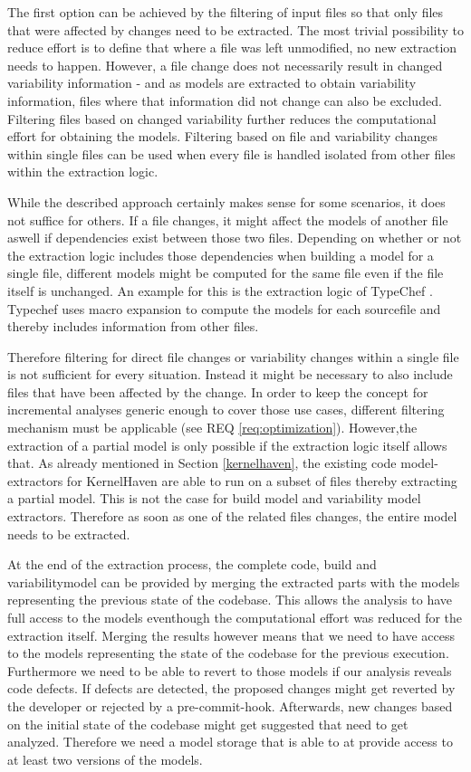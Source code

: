 \documentclass[a4paper]{article}
\begin{document}
The first option can be achieved by the filtering of input files so that only files that were affected by changes need to be extracted. The most trivial possibility to reduce effort is to define that where a file was left unmodified, no new extraction needs to happen. 
However, a file change does not necessarily result in changed variability information - and as models are extracted to obtain variability information, files where that information did not change can also be excluded. Filtering files based on changed variability further reduces the computational effort for obtaining the models. Filtering based on file and variability changes within single files can be used when every file is handled isolated from other files within the extraction logic.

While the described approach certainly makes sense for some scenarios, it does not suffice for others. If a file changes, it might affect the models of another file aswell if dependencies exist between those two files. Depending on whether or not the extraction logic includes those dependencies when building a model for a single file, different models might be computed for the same file even if the file itself is unchanged. An example for this is the extraction logic of TypeChef \cite{Kenner:2010:TTT:1868688.1868693}. Typechef uses macro expansion to compute the models for each sourcefile and thereby includes information from other files. 

Therefore filtering for direct file changes or variability changes within a single file is not sufficient for every situation. Instead it might be necessary to also include files that have been affected by the change. In order to keep the concept for incremental analyses generic enough to cover those use cases, different filtering mechanism must be applicable (see REQ \ref{req:optimization}). However,the extraction of a partial model is only possible if the extraction logic itself allows that. As already mentioned in Section \ref{kernelhaven}, the existing code model-extractors for KernelHaven  are able to run on a subset of files thereby extracting a partial model.  This is not the case for build model and variability model extractors. Therefore as soon as one of the related files changes, the entire model needs to be extracted.  

At the end of the extraction process, the complete code, build and variabilitymodel can be provided by merging the extracted parts with the models representing the previous state of the codebase. This allows the analysis to have full access to the models eventhough the computational effort was reduced for the extraction itself. Merging the results however means that we need to have access to the models representing the state of the codebase for the previous execution. Furthermore we need to be able to revert to those models if our analysis reveals code defects. If defects are detected, the proposed changes might get reverted by the developer or rejected by a pre-commit-hook. Afterwards, new changes based on the initial state of the codebase might get suggested that need to get analyzed. Therefore we need a model storage that is able to at provide access to at least two versions of the models.
\end{document}

